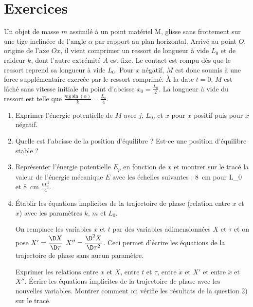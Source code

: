 \section{Exercices}
\label{chap5-sec:exercices}
\begin{exercice}
	Un objet de masse $m$ assimilé à un point matériel M, glisse sans frottement sur une tige inclinéee de l'angle $\alpha$ par rapport au plan horizontal. 
	Arrivé au point $O$, origine de l'axe $Ox$, il vient comprimer un ressort de longueur à vide $L_0$ et de raideur $k$, dont l'autre extrémité $A$ est fixe. Le contact est rompu dès que le ressort reprend sa longueur à vide $L_0$. Pour $x$ négatif, $M$ est donc soumis à une force supplémentaire exercée par le ressort comprimé.
	À la date $t=0$, $M$ est lâché sans vitesse initiale du point d'abcisse $x_0=\frac{L_0}{2}$. La longueur à vide du ressort est telle que $\frac{mg \sin(\alpha)}{k} = \frac{L_0}{4}$.
	\begin{enumerate}
		\item Exprimer l'énergie potentielle de $M$ avec $j$, $L_0$, et $x$ pour $x$ positif puis pour $x$ négatif.
		\item Quelle est l'abcisse de la position d'équilibre ? Est-ce une position d'équilibre stable ?
		\item Représenter l'énergie potentielle $E_p$ en fonction de $x$ et montrer sur le tracé la valeur de l'énergie mécanique $E$ avec les échelles suivantes : \SI{8}{\centi\meter} pour L_0 et \SI{8}{\centi\meter} $\frac{k L_0^2}{4}$.
		\item Établir les équations implicites de la trajectoire de phase (relation entre $x$ et $\dot{x}$) avec les paramètres $k$, $m$ et $L_0$. 
			
		On remplace les variables $x$ et $t$ par des variables adimensionnées $X$ et $\tau$ et on pose $X' = \derived{X}{\tau}$  $X'' = \deriveds{X}{\tau}$. Ceci permet d'écrire les équations de la trajectoire de phase sans aucun paramètre.

		Exprimer les relations entre $x$ et $X$, entre $t$ et $\tau$, entre $\dot{x}$ et $X'$ et entre $\ddot{x}$ et $X''$.
		Écrire les équations implicites de la trajectoire de phase avec les nouvelles variables. Montrer comment on vérifie les résultats de la question 2) sur le tracé.
	\end{enumerate}
\end{exercice}
